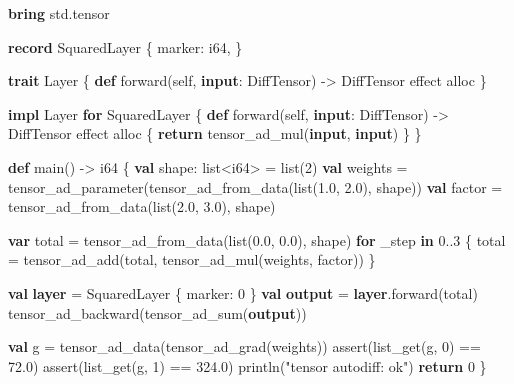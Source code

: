 \documentclass[
  english,
  oneside]{book}
\newenvironment{Shaded}{\begin{snugshade}}{\end{snugshade}}
\newcommand{\ControlFlowTok}[1]{\textcolor[rgb]{0.77,0.53,0.75}{\textbf{#1}}}
\newcommand{\DataTypeTok}[1]{\textcolor[rgb]{0.31,0.79,0.69}{#1}}
\newcommand{\DecValTok}[1]{\textcolor[rgb]{0.71,0.81,0.66}{#1}}
\newcommand{\FloatTok}[1]{\textcolor[rgb]{0.71,0.81,0.66}{#1}}
\newcommand{\FunctionTok}[1]{\textcolor[rgb]{0.86,0.86,0.67}{#1}}
\newcommand{\KeywordTok}[1]{\textcolor[rgb]{0.34,0.61,0.84}{\textbf{#1}}}
\newcommand{\NormalTok}[1]{\textcolor[rgb]{0.83,0.83,0.83}{#1}}
\newcommand{\OperatorTok}[1]{\textcolor[rgb]{0.83,0.83,0.83}{#1}}
\newcommand{\StringTok}[1]{\textcolor[rgb]{0.81,0.57,0.47}{#1}}
\begin{document}
\begin{Shaded}
\begin{Highlighting}[]
\KeywordTok{bring}\NormalTok{ std}\OperatorTok{.}\DataTypeTok{tensor}

\KeywordTok{record}\NormalTok{ SquaredLayer \{}
\NormalTok{    marker: }\DataTypeTok{i64}\NormalTok{,}
\NormalTok{\}}

\KeywordTok{trait}\NormalTok{ Layer \{}
    \KeywordTok{def}\NormalTok{ forward(self, }\KeywordTok{input}\NormalTok{: DiffTensor) }\OperatorTok{{-}\textgreater{}}\NormalTok{ DiffTensor effect alloc}
\NormalTok{\}}

\KeywordTok{impl}\NormalTok{ Layer }\ControlFlowTok{for}\NormalTok{ SquaredLayer \{}
    \KeywordTok{def}\NormalTok{ forward(self, }\KeywordTok{input}\NormalTok{: DiffTensor) }\OperatorTok{{-}\textgreater{}}\NormalTok{ DiffTensor effect alloc \{}
        \ControlFlowTok{return}\NormalTok{ tensor\_ad\_mul(}\KeywordTok{input}\NormalTok{, }\KeywordTok{input}\NormalTok{)}
\NormalTok{    \}}
\NormalTok{\}}

\KeywordTok{def}\NormalTok{ main() }\OperatorTok{{-}\textgreater{}} \DataTypeTok{i64}\NormalTok{ \{}
    \KeywordTok{val}\NormalTok{ shape: }\DataTypeTok{list}\OperatorTok{\textless{}}\DataTypeTok{i64}\OperatorTok{\textgreater{}} \OperatorTok{=} \DataTypeTok{list}\NormalTok{(}\DecValTok{2}\NormalTok{)}
    \KeywordTok{val}\NormalTok{ weights }\OperatorTok{=}\NormalTok{ tensor\_ad\_parameter(tensor\_ad\_from\_data(}\DataTypeTok{list}\NormalTok{(}\FloatTok{1.0}\NormalTok{, }\FloatTok{2.0}\NormalTok{), shape))}
    \KeywordTok{val}\NormalTok{ factor }\OperatorTok{=}\NormalTok{ tensor\_ad\_from\_data(}\DataTypeTok{list}\NormalTok{(}\FloatTok{2.0}\NormalTok{, }\FloatTok{3.0}\NormalTok{), shape)}

    \KeywordTok{var}\NormalTok{ total }\OperatorTok{=}\NormalTok{ tensor\_ad\_from\_data(}\DataTypeTok{list}\NormalTok{(}\FloatTok{0.0}\NormalTok{, }\FloatTok{0.0}\NormalTok{), shape)}
    \ControlFlowTok{for}\NormalTok{ \_step }\ControlFlowTok{in} \DecValTok{0}\OperatorTok{..}\DecValTok{3}\NormalTok{ \{}
\NormalTok{        total }\OperatorTok{=}\NormalTok{ tensor\_ad\_add(total, tensor\_ad\_mul(weights, factor))}
\NormalTok{    \}}

    \KeywordTok{val} \KeywordTok{layer} \OperatorTok{=}\NormalTok{ SquaredLayer \{ marker: }\DecValTok{0}\NormalTok{ \}}
    \KeywordTok{val} \KeywordTok{output} \OperatorTok{=} \KeywordTok{layer}\OperatorTok{.}\NormalTok{forward(total)}
\NormalTok{    tensor\_ad\_backward(tensor\_ad\_sum(}\KeywordTok{output}\NormalTok{))}

    \KeywordTok{val}\NormalTok{ g }\OperatorTok{=}\NormalTok{ tensor\_ad\_data(tensor\_ad\_grad(weights))}
    \FunctionTok{assert}\NormalTok{(}\FunctionTok{list\_get}\NormalTok{(g, }\DecValTok{0}\NormalTok{) }\OperatorTok{==} \FloatTok{72.0}\NormalTok{)}
    \FunctionTok{assert}\NormalTok{(}\FunctionTok{list\_get}\NormalTok{(g, }\DecValTok{1}\NormalTok{) }\OperatorTok{==} \FloatTok{324.0}\NormalTok{)}
\NormalTok{    println(}\StringTok{"tensor autodiff: ok"}\NormalTok{)}
    \ControlFlowTok{return} \DecValTok{0}
\NormalTok{\}}
\end{Highlighting}
\end{Shaded}
\end{document}
